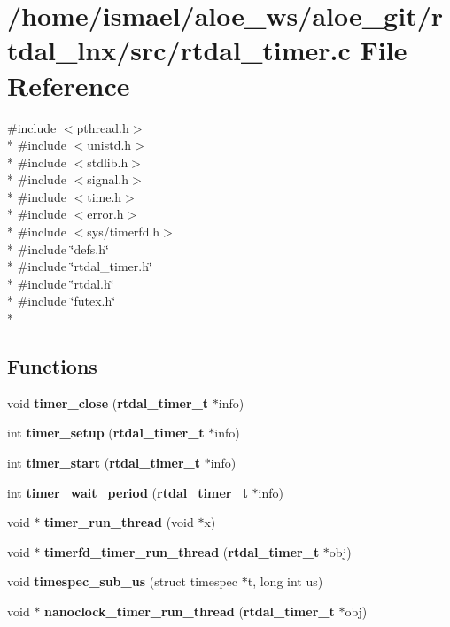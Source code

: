 \section{/home/ismael/aloe\-\_\-ws/aloe\-\_\-git/rtdal\-\_\-lnx/src/rtdal\-\_\-timer.c File Reference}
\label{rtdal__timer_8c}
{\ttfamily \#include $<$pthread.\-h$>$}\\*
{\ttfamily \#include $<$unistd.\-h$>$}\\*
{\ttfamily \#include $<$stdlib.\-h$>$}\\*
{\ttfamily \#include $<$signal.\-h$>$}\\*
{\ttfamily \#include $<$time.\-h$>$}\\*
{\ttfamily \#include $<$error.\-h$>$}\\*
{\ttfamily \#include $<$sys/timerfd.\-h$>$}\\*
{\ttfamily \#include \char`\"{}defs.\-h\char`\"{}}\\*
{\ttfamily \#include \char`\"{}rtdal\-\_\-timer.\-h\char`\"{}}\\*
{\ttfamily \#include \char`\"{}rtdal.\-h\char`\"{}}\\*
{\ttfamily \#include \char`\"{}futex.\-h\char`\"{}}\\*
\subsection*{Functions}
\begin{DoxyCompactItemize}
\item 
void {\bf timer\-\_\-close} ({\bf rtdal\-\_\-timer\-\_\-t} $\ast$info)
\item 
int {\bf timer\-\_\-setup} ({\bf rtdal\-\_\-timer\-\_\-t} $\ast$info)
\item 
int {\bf timer\-\_\-start} ({\bf rtdal\-\_\-timer\-\_\-t} $\ast$info)
\item 
int {\bf timer\-\_\-wait\-\_\-period} ({\bf rtdal\-\_\-timer\-\_\-t} $\ast$info)
\item 
void $\ast$ {\bf timer\-\_\-run\-\_\-thread} (void $\ast$x)
\item 
void $\ast$ {\bf timerfd\-\_\-timer\-\_\-run\-\_\-thread} ({\bf rtdal\-\_\-timer\-\_\-t} $\ast$obj)
\item 
void {\bf timespec\-\_\-sub\-\_\-us} (struct timespec $\ast$t, long int us)
\item 
void $\ast$ {\bf nanoclock\-\_\-timer\-\_\-run\-\_\-thread} ({\bf rtdal\-\_\-timer\-\_\-t} $\ast$obj)
\end{DoxyCompactItemize}


